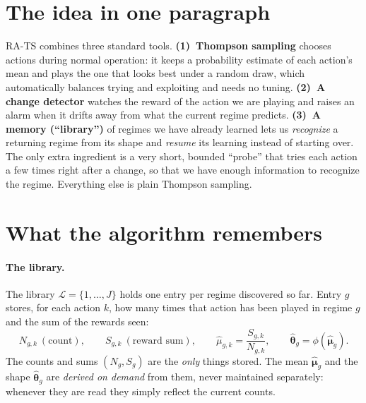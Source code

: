 \documentclass[11pt]{article}
\newcommand{\Lcal}{\mathcal L}
\begin{document}
\section{The idea in one paragraph}
\label{sec:idea}

RA-TS combines three standard tools. \textbf{(1)~Thompson sampling} chooses actions during normal
operation: it keeps a probability estimate of each action's mean and plays the one that looks
best under a random draw, which automatically balances trying and exploiting and needs no tuning.
\textbf{(2)~A change detector} watches the reward of the action we are playing and raises an alarm
when it drifts away from what the current regime predicts. \textbf{(3)~A memory (``library'')} of
regimes we have already learned lets us \emph{recognize} a returning regime from its shape and
\emph{resume} its learning instead of starting over. The only extra ingredient is a very short,
bounded ``probe'' that tries each action a few times right after a change, so that we have enough
information to recognize the regime. Everything else is plain Thompson sampling.

\section{What the algorithm remembers}
\label{sec:state}

\paragraph{The library.}
The library $\Lcal=\{1,\dots,J\}$ holds one entry per regime discovered so far. Entry $g$ stores,
for each action $k$, how many times that action has been played in regime $g$ and the sum of the
rewards seen:
\begin{equation}
    N_{g,k}\ (\text{count}), \qquad S_{g,k}\ (\text{reward sum}), \qquad
    \widehat\mu_{g,k}=\frac{S_{g,k}}{N_{g,k}}, \qquad
    \widehat{\bm\theta}_g=\phi(\widehat{\bm\mu}_g).
    \label{eq:lib}
\end{equation}
The counts and sums $(N_g,S_g)$ are the \emph{only} things stored. The mean
$\widehat{\bm\mu}_g$ and the shape $\widehat{\bm\theta}_g$ are \emph{derived on demand} from them,
never maintained separately: whenever they are read they simply reflect the current counts.
\end{document}
